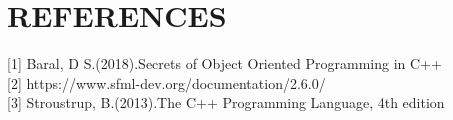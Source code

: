 \section{REFERENCES}


 \hspace{0.65cm}[1] Baral, D S.(2018).Secrets of Object Oriented Programming in C++\\
 
 [2] https://www.sfml-dev.org/documentation/2.6.0/\\
 
 [3] Stroustrup, B.(2013).The C++ Programming Language, 4th edition\\
 
\newpage